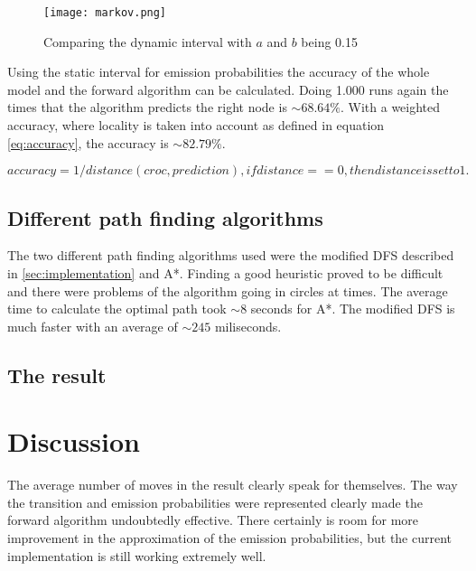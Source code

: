 \documentclass[12pt, a4paper]{article}
\begin{document}
\begin{figure}[!ht]\label{fig:box-sqrt-fif.png}
\centering
\texttt{[image: markov.png]}\\
\caption{Comparing the dynamic interval with $a$ and $b$ being 0.15}
\end{figure}

Using the static interval for emission probabilities the accuracy of the whole model and the forward algorithm can be calculated. Doing 1.000 runs again the times that the algorithm predicts the right node is $\sim68.64\%$. With a weighted accuracy, where locality is taken into account as defined in equation \ref{eq:accuracy}, the accuracy is $\sim82.79\%$.

\begin{equation}\label{eq:RemissionInt}
accuracy = 1 / distance(croc, prediction), if distance == 0, then distance is set to 1.
\end{equation}

\subsection{Different path finding algorithms}

The two different path finding algorithms used were the modified DFS described in \ref{sec:implementation} and A*. Finding a good heuristic proved to be difficult and there were problems of the algorithm going in circles at times. The average time to calculate the optimal path took $\sim8$ seconds for A*. The modified DFS is much faster with an average of $\sim245$ miliseconds.

\subsection{The result}

\section{Discussion}

The average number of moves in the result clearly speak for themselves. The way the transition and emission probabilities were represented clearly made the forward algorithm undoubtedly effective. There certainly is room for more improvement in the approximation of the emission probabilities, but the current implementation is still working extremely well.
\end{document}

